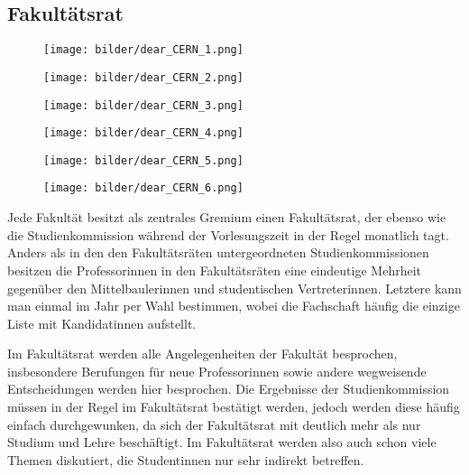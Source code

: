 \subsection{Fakultätsrat}

\begin{figure*}[b]
    \centering
    \begin{subfigure}{.3\textwidth}
	\texttt{[image: bilder/dear\_CERN\_1.png]}
	\vspace{7mm}
    \end{subfigure}
    \begin{subfigure}{.3\textwidth}
	\texttt{[image: bilder/dear\_CERN\_2.png]}
	\vspace{7mm}
    \end{subfigure}
    \begin{subfigure}{.3\textwidth}
	\texttt{[image: bilder/dear\_CERN\_3.png]}
	\vspace{7mm}
    \end{subfigure}
    \begin{subfigure}{.3\textwidth}
	\texttt{[image: bilder/dear\_CERN\_4.png]}
    \end{subfigure}
    \begin{subfigure}{.3\textwidth}
	\texttt{[image: bilder/dear\_CERN\_5.png]}
    \end{subfigure}
    \begin{subfigure}{.3\textwidth}
	\texttt{[image: bilder/dear\_CERN\_6.png]}
    \end{subfigure}
\end{figure*}

Jede Fakultät besitzt als zentrales Gremium einen Fakultätsrat, der ebenso wie die Studienkommission während der Vorlesungszeit in der Regel monatlich tagt. Anders als in den den Fakultätsräten untergeordneten Studienkommissionen besitzen die Professorinnen in den Fakultätsräten eine eindeutige Mehrheit gegenüber den Mittelbaulerinnen und studentischen Vertreterinnen. Letztere kann man einmal im Jahr per Wahl bestimmen, wobei die Fachschaft häufig die einzige Liste mit Kandidatinnen aufstellt.

Im Fakultätsrat werden alle Angelegenheiten der Fakultät besprochen, insbesondere Berufungen für neue Professorinnen sowie andere wegweisende Entscheidungen werden hier besprochen. Die Ergebnisse der Studienkommission müssen in der Regel im Fakultätsrat bestätigt werden, jedoch werden diese häufig einfach durchgewunken, da sich der Fakultätsrat mit deutlich mehr als nur Studium und Lehre beschäftigt. Im Fakultätsrat werden also auch schon viele Themen diskutiert, die Studentinnen nur sehr indirekt betreffen.

